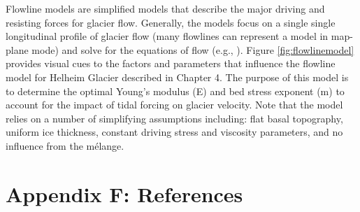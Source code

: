 Flowline models are simplified models that describe the major driving and resisting forces for glacier flow. Generally, the models focus on a single single longitudinal profile of glacier flow (many flowlines can represent a model in map-plane mode) and solve for the equations of flow (e.g., \citet{nick2006dynamics,nick2010physically,walker2012viscoelastic,walker2014ice}). Figure \ref{fig:flowlinemodel} provides visual cues to the factors and parameters that influence the flowline model for Helheim Glacier described in Chapter 4. The purpose of this model is to determine the optimal Young's modulus (E) and bed stress exponent (m) to account for the impact of tidal forcing on glacier velocity. Note that the model relies on a number of simplifying assumptions including: flat basal topography, uniform ice thickness, constant driving stress and viscosity parameters, and no influence from the m\'elange. 


\newpage
\section*{Appendix F: References}





